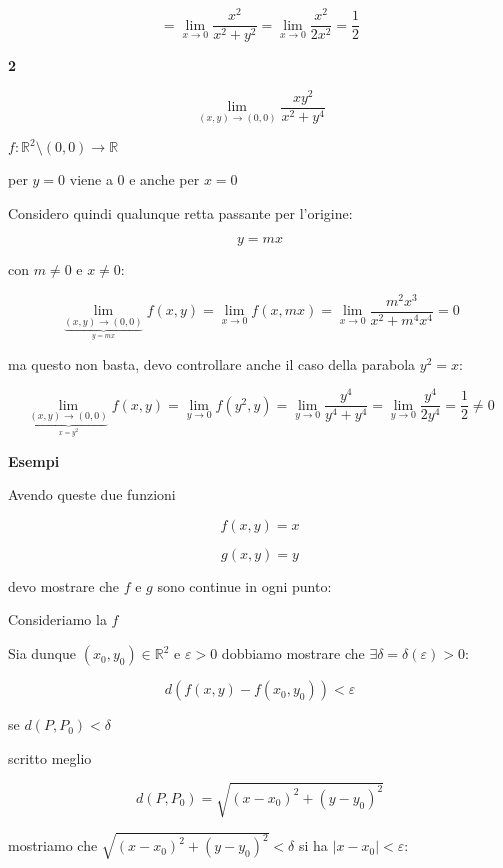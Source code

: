 \documentclass[11pt]{article}
\begin{document}
\[
    = \lim_{ x \to 0 } \frac{x^{2}}{x^{2}+y^{2}} = \lim_{ x \to 0 } \frac{x^{2}}{2x^{2}}= \frac{1}{2}
\]

\textbf{2} 

\[
    \lim_{ (x,y) \to (0,0) } \frac{xy^{2}}{x^{2}+y^{4}}
\]

$f:\mathbb{R}^{2}\setminus (0,0) \rightarrow \mathbb{R}$

per $y=0$ viene a 0 e anche per $x=0$

Considero quindi qualunque retta passante per l'origine:

\[
    y= mx
\]

con $m \neq 0$ e $x \neq 0$:

\[
    \lim_{ \underbrace{(x,y) \to (0,0)}_{y=mx} } f(x,y) = \lim_{ x \to 0 } f(x,mx) = \lim_{ x \to 0 } \frac{m^{2}x^{3}}{x^{2}+m^{4}x^{4}}= 0
\]

ma questo non basta, devo controllare anche il caso della parabola $y^{2}=x$:


\[
    \lim_{ \underbrace{(x,y) \to (0,0)}_{x=y^{2}} } f(x,y) = \lim_{ y \to 0 } f(y^{2},y) = \lim_{ y \to 0 } \frac{y^{4}}{y^{4}+y^{4}} = \lim_{ y \to 0 } \frac{y^{4}}{2y^{4}} = \frac{1}{2} \neq 0
\]


\textbf{Esempi} 

Avendo queste due funzioni 

\[
    f(x,y)=x
\]

\[
    g(x,y) = y
\]

devo mostrare che $f$ e $g$ sono continue in ogni punto:

Consideriamo la $f$
 
Sia dunque $(x_0,y_0) \in  \mathbb{R}^{2}$ e $\varepsilon >0$ dobbiamo mostrare che $\exists \delta= \delta(\varepsilon) >0$:

\[
     d(f(x,y)- f(x_0,y_0) ) < \varepsilon
\]

se $d(P,P_0) < \delta$ 

scritto meglio

\[
    d(P,P_0) = \sqrt{(x-x_0)^{2}+(y-y_0)^{2}}
\]

mostriamo che $\sqrt{(x-x_0)^{2}+(y-y_0)^{2}} < \delta $ si ha $|x-x_0|< \varepsilon$:
\end{document}
